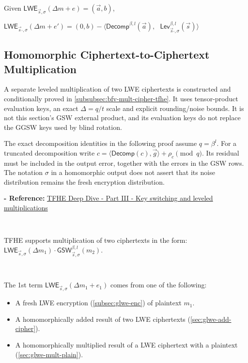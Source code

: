 \begin{tcolorbox}[title={\textbf{\tboxlabel{\ref*{subsec:tfhe-key-switching}} TFHE Key Switching}}]

Given $\textsf{LWE}_{\vec{s},\sigma}(\Delta m + e) = (\vec{a}, b)$,

$\textsf{LWE}_{\vec{s}_{'},\sigma}(\Delta m + e') = (0, b) - \bm{\langle} \textsf{Decomp}^{\beta, l}(\vec{a}), \text{ } \textsf{Lev}_{\vec{s}_{'}, \sigma}^{\beta, l}(\vec{s}) \bm{\rangle}$
\end{tcolorbox}


\subsection{Homomorphic Ciphertext-to-Ciphertext Multiplication}
\label{subsec:tfhe-mult-cipher}

A separate leveled multiplication of two LWE ciphertexts is constructed and conditionally proved in \autoref{subsubsec:bfv-mult-cipher-tfhe}. It uses tensor-product evaluation keys, an exact $\Delta=q/t$ scale and explicit rounding/noise bounds. It is not this section's GSW external product, and its evaluation keys do not replace the GGSW keys used by blind rotation.

The exact decomposition identities in the following proof assume $q=\beta^l$. For a truncated decomposition write $c=\langle\textsf{Decomp}(c),\vec g\rangle+\rho_c\pmod q$. Its residual must be included in the output error, together with the errors in the GSW rows. The notation $\sigma$ in a homomorphic output does not assert that its noise distribution remains the fresh encryption distribution.

\textbf{- Reference:} 
\href{https://www.zama.ai/post/tfhe-deep-dive-part-3}{TFHE Deep Dive - Part III - Key switching and leveled multiplications}~\cite{tfhe-3}

$ $

TFHE supports multiplication of two ciphertexts in the form: $\textsf{LWE}_{\vec{s}, \sigma}(\Delta m_1) \cdot \textsf{GSW}_{\vec{s}, \sigma}^{\beta, l}(m_2)$. 

$ $

\noindent The 1st term $\textsf{LWE}_{\vec{s}, \sigma}(\Delta m_1 + e_1)$ comes from one of the following: 
\begin{itemize}
\item A fresh LWE encryption (\autoref{subsec:glwe-enc}) of plaintext $m_1$. 
\item A homomorphically added result of two LWE ciphertexts (\autoref{sec:glwe-add-cipher}). 
\item A homomorphically multiplied result of a LWE ciphertext with a plaintext (\autoref{sec:glwe-mult-plain}). 
\end{itemize}

